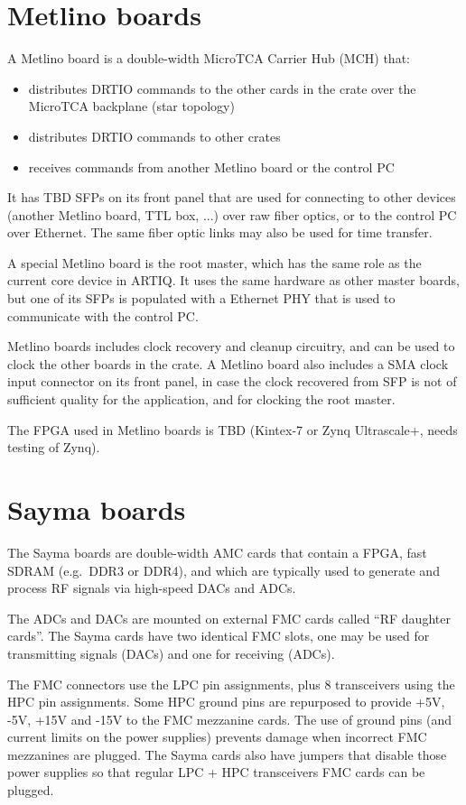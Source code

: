 \documentclass[11pt]{paper}
\begin{document}
\section{Metlino boards}
A Metlino board is a double-width MicroTCA Carrier Hub (MCH) that:
\begin{itemize}
\item distributes DRTIO commands to the other cards in the crate over the MicroTCA backplane (star topology)
\item distributes DRTIO commands to other crates
\item receives commands from another Metlino board or the control PC
\end{itemize}

It has TBD SFPs on its front panel that are used for connecting to other devices (another Metlino board, TTL box, ...) over raw fiber optics, or to the control PC over Ethernet. The same fiber optic links may also be used for time transfer.

A special Metlino board is the root master, which has the same role as the current core device in ARTIQ. It uses the same hardware as other master boards, but one of its SFPs is populated with a Ethernet PHY that is used to communicate with the control PC.

Metlino boards includes clock recovery and cleanup circuitry, and can be used to clock the other boards in the crate. A Metlino board also includes a SMA clock input connector on its front panel, in case the clock recovered from SFP is not of sufficient quality for the application, and for clocking the root master.

The FPGA used in Metlino boards is TBD (Kintex-7 or Zynq Ultrascale+, needs testing of Zynq).

\section{Sayma boards}
The Sayma boards are double-width AMC cards that contain a FPGA, fast SDRAM (e.g.\ DDR3 or DDR4), and which are typically used to generate and process RF signals via high-speed DACs and ADCs.

The ADCs and DACs are mounted on external FMC cards called ``RF daughter cards''. The Sayma cards have two identical FMC slots, one may be used for transmitting signals (DACs) and one for receiving (ADCs).

The FMC connectors use the LPC pin assignments, plus 8 transceivers using the HPC pin assignments. Some HPC ground pins are repurposed to provide +5V, -5V, +15V and -15V to the FMC mezzanine cards. The use of ground pins (and current limits on the power supplies) prevents damage when incorrect FMC mezzanines are plugged. The Sayma cards also have jumpers that disable those power supplies so that regular LPC + HPC transceivers FMC cards can be plugged.
\end{document}

